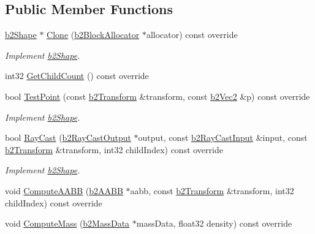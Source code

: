 \subsection*{Public Member Functions}
\begin{DoxyCompactItemize}
\item 
\mbox{\label{classb2CircleShape_a5ff8fbab7dff87784fbff20b07e55cfc}} 
\mbox{\hyperlink{classb2Shape}{b2\+Shape}} $\ast$ \mbox{\hyperlink{classb2CircleShape_a5ff8fbab7dff87784fbff20b07e55cfc}{Clone}} (\mbox{\hyperlink{classb2BlockAllocator}{b2\+Block\+Allocator}} $\ast$allocator) const override
\begin{DoxyCompactList}\small\item\em Implement \mbox{\hyperlink{classb2Shape}{b2\+Shape}}. \end{DoxyCompactList}\item 
int32 \mbox{\hyperlink{classb2CircleShape_a552db3402aed5d12c3177981e5208065}{Get\+Child\+Count}} () const override
\item 
\mbox{\label{classb2CircleShape_a84e22b3807e84b72f2981010fc197099}} 
bool \mbox{\hyperlink{classb2CircleShape_a84e22b3807e84b72f2981010fc197099}{Test\+Point}} (const \mbox{\hyperlink{structb2Transform}{b2\+Transform}} \&transform, const \mbox{\hyperlink{structb2Vec2}{b2\+Vec2}} \&p) const override
\begin{DoxyCompactList}\small\item\em Implement \mbox{\hyperlink{classb2Shape}{b2\+Shape}}. \end{DoxyCompactList}\item 
\mbox{\label{classb2CircleShape_a442e847b9fc3d1344b02b48d490eb0c6}} 
bool \mbox{\hyperlink{classb2CircleShape_a442e847b9fc3d1344b02b48d490eb0c6}{Ray\+Cast}} (\mbox{\hyperlink{structb2RayCastOutput}{b2\+Ray\+Cast\+Output}} $\ast$output, const \mbox{\hyperlink{structb2RayCastInput}{b2\+Ray\+Cast\+Input}} \&input, const \mbox{\hyperlink{structb2Transform}{b2\+Transform}} \&transform, int32 child\+Index) const override
\begin{DoxyCompactList}\small\item\em Implement \mbox{\hyperlink{classb2Shape}{b2\+Shape}}. \end{DoxyCompactList}\item 
void \mbox{\hyperlink{classb2CircleShape_af4a4ea78780af7a7ce40bf5d54affe83}{Compute\+A\+A\+BB}} (\mbox{\hyperlink{structb2AABB}{b2\+A\+A\+BB}} $\ast$aabb, const \mbox{\hyperlink{structb2Transform}{b2\+Transform}} \&transform, int32 child\+Index) const override
\item 
void \mbox{\hyperlink{classb2CircleShape_a7dc07891abd015863fbf03076e47eec5}{Compute\+Mass}} (\mbox{\hyperlink{structb2MassData}{b2\+Mass\+Data}} $\ast$mass\+Data, float32 density) const override
\end{DoxyCompactItemize}
